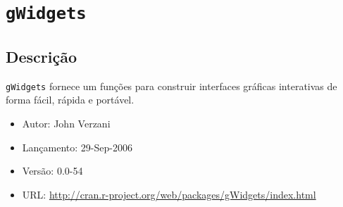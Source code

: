 \section{\texttt{gWidgets}}


\subsection{Descrição}

\begin{frame}

  \texttt{gWidgets} fornece um funções para construir interfaces
  gráficas interativas de forma fácil, rápida e portável.  \vspace{2em}

  \begin{itemize}
  \item Autor: John Verzani
  \item Lançamento: 29-Sep-2006
  \item Versão: 0.0-54
  \item URL:
    \url{http://cran.r-project.org/web/packages/gWidgets/index.html}
  \end{itemize}

\end{frame}

\begin{center}
\end{center}

